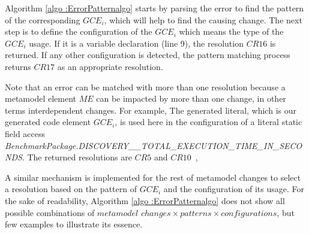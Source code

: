 Algorithm \ref{algo :ErrorPatternalgo} starts by parsing the error to find the pattern of the corresponding $GCE_i$, which will help to find the causing change. The next step is to define the configuration of the $GCE_i$ which means the type of the $GCE_i$ usage. 
If it is a variable declaration (line 9), the resolution $CR16$ is returned. If any other configuration is detected, the pattern matching process returns $CR17$ as an appropriate resolution.

Note that an error can be matched with more than one resolution because a metamodel element $ME$ can be impacted by more than one change, in other terms interdependent changes. 
For example,  The generated literal, which is our generated code element $GCE_i$, is used here in the configuration of a literal static field access 
\emph{\footnotesize{BenchmarkPackage.DISCOVERY\_\_TOTAL\_EXECUTION\_TIME\_IN\_SECONDS}}. The returned resolutions are $CR5$ and $CR10$~{\small{}}, %

A similar mechanism is implemented for the rest of metamodel changes to select a resolution based on the pattern of $GCE_i$ and the configuration of its usage. %
For the sake of readability, Algorithm \ref{algo :ErrorPatternalgo} does not show all possible combinations of $metamodel$ $changes \times patterns \times configurations$, but few examples to illustrate its essence. 

